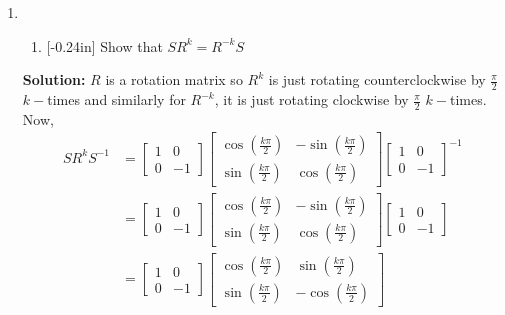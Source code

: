 \documentclass[letterpaper,12pt]{article}
\theoremstyle{definition}
\begin{document}
\begin{enumerate}
    \item[] \begin{enumerate}
        \item\reversemarginpar{}[-0.24in] Show that $SR^k = R^{-k}S$
    \end{enumerate}
    \begin{mdframed}
        \textbf{Solution:}
        $R$ is a rotation matrix so $R^k$ is just rotating counterclockwise by $\frac{\pi}{2}$ $k-$times and similarly for $R^{-k}$, it is just rotating clockwise by $\frac{\pi}{2}$ $k-$times. Now,
        \begin{align*}
            SR^kS^{-1} &= \begin{bmatrix}
            1 & 0 \\ 0 & -1
        \end{bmatrix}\begin{bmatrix}
            \cos \left (\frac{k\pi}{2} \right ) & -\sin \left (\frac{k\pi}{2} \right ) \\ \sin \left (\frac{k\pi}{2} \right ) & \cos \left (\frac{k\pi}{2} \right )
        \end{bmatrix}\begin{bmatrix}
            1 & 0 \\ 0 & -1
        \end{bmatrix}^{-1} \\
        &= \begin{bmatrix}
            1 & 0 \\ 0 & -1
        \end{bmatrix}\begin{bmatrix}
            \cos \left (\frac{k\pi}{2} \right ) & -\sin \left (\frac{k\pi}{2} \right ) \\ \sin \left (\frac{k\pi}{2} \right ) & \cos \left (\frac{k\pi}{2} \right )
        \end{bmatrix}\begin{bmatrix}
            1 & 0 \\ 0 & -1
        \end{bmatrix}
        \\
        &=  \begin{bmatrix}
            1 & 0 \\ 0 & -1
        \end{bmatrix}\begin{bmatrix}
            \cos \left (\frac{k\pi}{2} \right ) & \sin \left (\frac{k\pi}{2} \right ) \\ \sin \left (\frac{k\pi}{2} \right ) & -\cos \left (\frac{k\pi}{2} \right )

\end{bmatrix}
\end{align*}
\end{mdframed}
\end{enumerate}
\end{document}
